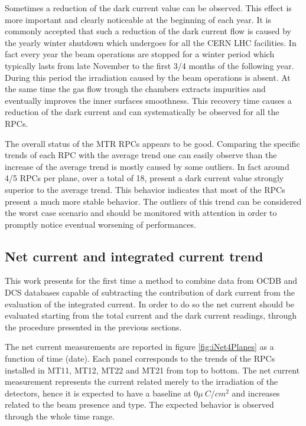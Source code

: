 Sometimes a reduction of the dark current value can be observed.
This effect is more important and clearly noticeable at the beginning of each year.
It is commonly accepted that such a reduction of the dark current flow is caused by the yearly winter shutdown which undergoes for all the CERN LHC facilities.
In fact every year the beam operations are stopped for a winter period which typically lasts from late November to the first 3/4 months of the following year.
During this period the irradiation caused by the beam operations is absent.
At the same time the gas flow trough the chambers extracts impurities and eventually improves the inner surfaces smoothness.
This recovery time causes a reduction of the dark current and can systematically be observed for all the RPCs.

The overall status of the MTR RPCs appears to be good.
Comparing the specific trends of each RPC with the average trend one can easily observe than the increase of the average trend is mostly caused by some outliers.
In fact around 4/5 RPCs per plane, over a total of 18, present a dark current value strongly superior to the average trend.
This behavior indicates that most of the RPCs present a much more stable behavior.
The outliers of this trend can be considered the worst case scenario and should be monitored with attention in order to promptly notice eventual worsening of performances.

\subsection{Net current and integrated current trend}
This work presents for the first time a method to combine data from OCDB and DCS databases capable of subtracting the contribution of dark current from the evaluation of the integrated current.
In order to do so the net current should be evaluated starting from the total current and the dark current readings, through the procedure presented in the previous sections.

The net current measurements are reported in figure \ref{fig:iNet4Planes} as a function of time (date).
Each panel corresponds to the trends of the RPCs installed in MT11, MT12, MT22 and MT21 from top to bottom.
The net current measurement represents the current related merely to the irradiation of the detectors, hence it is expected to have a baseline at $0 \mu~C/cm^2$ and increases related to the beam presence and type.
The expected behavior is observed through the whole time range.

